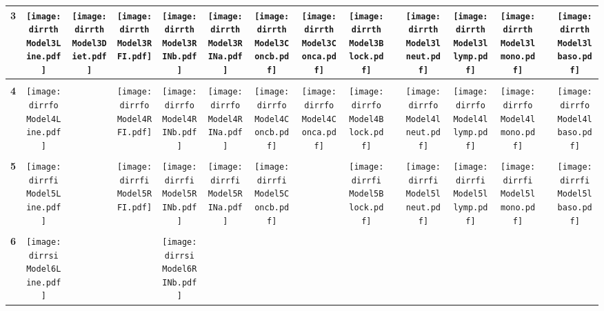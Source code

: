 \documentclass[landscape]{article}
\def \dirrth {/run/user/1000/gvfs/smb-share:server=cyfiles.iastate.edu,share=09/22/ntyet/R/RA/Data/RFI-newdata/resultpaired/Model3.Line.Diet.RFI.Concb.RINb.Conca.RINa.lneut.llymp.lmono.lbaso.Block/}
\def \dirrfo {/run/user/1000/gvfs/smb-share:server=cyfiles.iastate.edu,share=09/22/ntyet/R/RA/Data/RFI-newdata/resultpaired/Model4.Line.RFI.Concb.RINb.Conca.RINa.lneut.llymp.lmono.lbaso.Block/}
\def \dirrfi {/run/user/1000/gvfs/smb-share:server=cyfiles.iastate.edu,share=09/22/ntyet/R/RA/Data/RFI-newdata/resultpaired/Model5.Line.RFI.Concb.RINb.RINa.lneut.llymp.lmono.lbaso.Block/}
\def \dirrsi{/run/user/1000/gvfs/smb-share:server=cyfiles.iastate.edu,share=09/22/ntyet/R/RA/Data/RFI-newdata/resultpaired/Model6.Line.Concb.RINb.RINa.lneut.llymp.lmono.lbaso.Block/}
\begin{document}
\begin{table}
\begin{tabular}{ccccccccccccccc}
      {\Huge \textbf{3}} 
      &\texttt{[image: \\dirrth Model3Line.pdf]}
      &\texttt{[image: \\dirrth Model3Diet.pdf]}
      &\texttt{[image: \\dirrth Model3RFI.pdf]}
      &\texttt{[image: \\dirrth Model3RINb.pdf]}
      &\texttt{[image: \\dirrth Model3RINa.pdf]}
      &\texttt{[image: \\dirrth Model3Concb.pdf]}
      &\texttt{[image: \\dirrth Model3Conca.pdf]}
      &\texttt{[image: \\dirrth Model3Block.pdf]}
      &
      &\texttt{[image: \\dirrth Model3lneut.pdf]}
      &\texttt{[image: \\dirrth Model3llymp.pdf]}
      &\texttt{[image: \\dirrth Model3lmono.pdf]}
      &
      &\texttt{[image: \\dirrth Model3lbaso.pdf]}
     \\[3.5pt]
     \hline
     \\[3.5pt]
     {\Huge \textbf{4}} 
      &\texttt{[image: \\dirrfo Model4Line.pdf]}
      &
      &\texttt{[image: \\dirrfo Model4RFI.pdf]}
      &\texttt{[image: \\dirrfo Model4RINb.pdf]}
      &\texttt{[image: \\dirrfo Model4RINa.pdf]}
      &\texttt{[image: \\dirrfo Model4Concb.pdf]}
      &\texttt{[image: \\dirrfo Model4Conca.pdf]}
      &\texttt{[image: \\dirrfo Model4Block.pdf]}
      &
      &\texttt{[image: \\dirrfo Model4lneut.pdf]}
      &\texttt{[image: \\dirrfo Model4llymp.pdf]}
      &\texttt{[image: \\dirrfo Model4lmono.pdf]}
      &
      &\texttt{[image: \\dirrfo Model4lbaso.pdf]}
     \\[3.5pt]
     \hline
     \\[3.5pt]
     {\Huge \textbf{5}} 
      &\texttt{[image: \\dirrfi Model5Line.pdf]}
      &
      &\texttt{[image: \\dirrfi Model5RFI.pdf]}
      &\texttt{[image: \\dirrfi Model5RINb.pdf]}
      &\texttt{[image: \\dirrfi Model5RINa.pdf]}
      &\texttt{[image: \\dirrfi Model5Concb.pdf]}
      &
      &\texttt{[image: \\dirrfi Model5Block.pdf]}
      &
      &\texttt{[image: \\dirrfi Model5lneut.pdf]}
      &\texttt{[image: \\dirrfi Model5llymp.pdf]}
      &\texttt{[image: \\dirrfi Model5lmono.pdf]}
      &
      &\texttt{[image: \\dirrfi Model5lbaso.pdf]}
     \\[3.5pt]
     \hline
     \\[3.5pt]
     {\Huge \textbf{6}} 
      &\texttt{[image: \\dirrsi Model6Line.pdf]}
      &
      &
      &\texttt{[image: \\dirrsi Model6RINb.pdf]}

\end{tabular}
\end{table}
\end{document}
